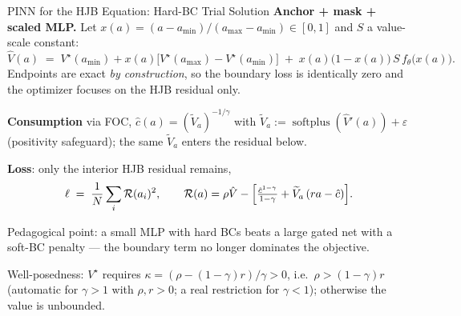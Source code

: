\documentclass[aspectratio=169,11pt]{beamer}
\newcommand{\emphc}[1]{\textcolor{harvardcrimson}{#1}}
\begin{document}
\begin{frame}{PINN for the HJB Equation: Hard-BC Trial Solution}
\small
\textbf{Anchor + mask + scaled MLP.}  Let $x(a) = (a-a_{\min})/(a_{\max}-a_{\min}) \in [0,1]$ and $S$ a value-scale constant:
\[
\hat V(a) \;=\; V^\star(a_{\min}) + x(a)\bigl[V^\star(a_{\max}) - V^\star(a_{\min})\bigr] \;+\; x(a)\bigl(1-x(a)\bigr)\,S\,f_\theta\bigl(x(a)\bigr).
\]
Endpoints are exact \emph{by construction}, so the boundary loss is identically zero and the optimizer focuses on the HJB residual only.

\vspace{0.15em}
\textbf{Consumption} via FOC, $\hat c(a) = (\widetilde V_a)^{-1/\gamma}$ with $\widetilde V_a := \operatorname{softplus}(\hat V'(a)) + \varepsilon$ (positivity safeguard); the same $\widetilde V_a$ enters the residual below.

\vspace{0.15em}
\textbf{Loss}: only the interior HJB residual remains,
\[
\ell \;=\; \frac{1}{N}\sum_{i}\mathcal{R}(a_i)^2,
\qquad
\mathcal{R}(a) = \rho\hat V - \Bigl[\tfrac{\hat c^{1-\gamma}}{1-\gamma} + \widetilde V_a\,(ra - \hat c)\Bigr].
\]

\vspace{0.15em}
{\small \emphc{Pedagogical point:} a small MLP with hard BCs beats a large gated net with a soft-BC penalty --- the boundary term no longer dominates the objective.}

\vspace{0.15em}
{\scriptsize \emphc{Well-posedness:} $V^\star$ requires $\kappa = (\rho - (1-\gamma) r)/\gamma > 0$, i.e.\ $\rho > (1-\gamma)r$ (automatic for $\gamma > 1$ with $\rho, r > 0$; a real restriction for $\gamma < 1$); otherwise the value is unbounded.}
\end{frame}
\end{document}

